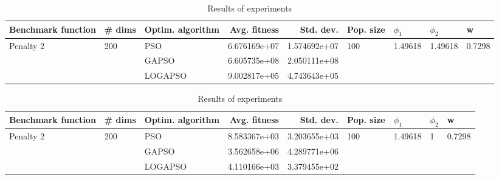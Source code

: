 \documentclass{article}
\begin{document}
\begin{table}
\centering
\caption{Results of experiments}
\begin{tabular}{lllrrllll}
\toprule
        Benchmark function &              \# dims & Optim. algorithm &  Avg. fitness &    Std. dev. &            Pop. size &               $\phi_{1}$ &               $\phi_{2}$ &                       w \\
\midrule
\multirow{3}{*}{Penalty 2} & \multirow{3}{*}{200} &              PSO &  6.676169e+07 & 1.574692e+07 & \multirow{3}{*}{100} & \multirow{3}{*}{1.49618} & \multirow{3}{*}{1.49618} & \multirow{3}{*}{0.7298} \\
                           &                      &            GAPSO &  6.605735e+08 & 2.050111e+08 &                      &                          &                          &                         \\
                           &                      &          LOGAPSO &  9.002817e+05 & 4.743643e+05 &                      &                          &                          &                         \\
\bottomrule
\end{tabular}
\end{table}
\begin{table}
\centering
\caption{Results of experiments}
\begin{tabular}{lllrrllll}
\toprule
        Benchmark function &              \# dims & Optim. algorithm &  Avg. fitness &    Std. dev. &            Pop. size &               $\phi_{1}$ &         $\phi_{2}$ &                       w \\
\midrule
\multirow{3}{*}{Penalty 2} & \multirow{3}{*}{200} &              PSO &  8.583367e+03 & 3.203655e+03 & \multirow{3}{*}{100} & \multirow{3}{*}{1.49618} & \multirow{3}{*}{1} & \multirow{3}{*}{0.7298} \\
                           &                      &            GAPSO &  3.562658e+06 & 4.289771e+06 &                      &                          &                    &                         \\
                           &                      &          LOGAPSO &  4.110166e+03 & 3.379455e+02 &                      &                          &                    &                         \\
\bottomrule
\end{tabular}
\end{table}
\end{document}
